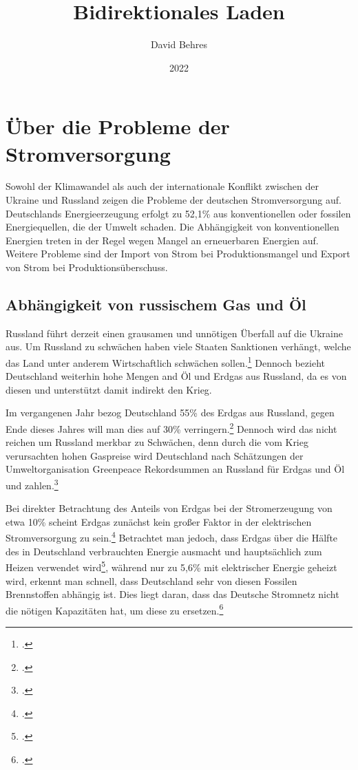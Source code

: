 \documentclass[12pt]{article}
\title{Bidirektionales Laden}
\author{David Behres}
\date{2022}
\begin{document}
    \tableofcontents
    \pagebreak

    \section{Über die Probleme der Stromversorgung}
    Sowohl der Klimawandel als auch der internationale Konflikt zwischen der Ukraine und Russland
    zeigen die Probleme der deutschen Stromversorgung auf.
    Deutschlands Energieerzeugung erfolgt zu 52,1\% aus konventionellen oder fossilen Energiequellen, die der Umwelt
    schaden.
    Die Abhängigkeit von konventionellen Energien treten in der Regel wegen Mangel an erneuerbaren Energien auf.
    Weitere Probleme sind der Import von Strom bei Produktionsmangel und Export von Strom bei Produktionsüberschuss.

    \subsection{Abhängigkeit von russischem Gas und Öl}
    Russland führt derzeit einen grausamen und unnötigen Überfall auf die Ukraine aus.
    Um Russland zu schwächen haben viele Staaten Sanktionen verhängt, welche das Land unter anderem
    Wirtschaftlich schwächen sollen.\footcite{SanktionenGegenRussland2022}
    Dennoch bezieht Deutschland weiterhin hohe Mengen and Öl und Erdgas aus Russland, da es von diesen und
    unterstützt damit indirekt den Krieg.

    Im vergangenen Jahr bezog Deutschland 55\% des Erdgas aus Russland, gegen Ende dieses Jahres will man dies auf
    30\% verringern.\footcite{wdraktuellFAQWasGasLieferstopp} Dennoch wird das nicht reichen um Russland merkbar zu
    Schwächen, denn durch die vom Krieg verursachten hohen Gaspreise wird Deutschland nach Schätzungen der
    Umweltorganisation Greenpeace Rekordsummen an Russland für Erdgas und Öl und zahlen.\footcite{balserOlUndGas}

    Bei direkter Betrachtung des Anteils von Erdgas bei der Stromerzeugung von etwa 10\% scheint Erdgas zunächst
    kein großer Faktor in der elektrischen Stromversorgung zu sein.\footcite{SMARDHoherEEAnteil, EnergieWofurErdgas}
    Betrachtet man jedoch, dass Erdgas über die Hälfte des in Deutschland verbrauchten
    Energie ausmacht und hauptsächlich zum Heizen verwendet wird\footcite{Anwendungsbereiche, EnergieWofurErdgas},
    während nur zu 5,6\% mit elektrischer Energie geheizt wird, erkennt man schnell, dass Deutschland sehr von diesen
    Fossilen Brennstoffen abhängig ist.
    Dies liegt daran, dass das Deutsche Stromnetz nicht die nötigen Kapazitäten hat, um diese zu
    ersetzen.\footcite{EnergieWofurErdgas}
\end{document}
